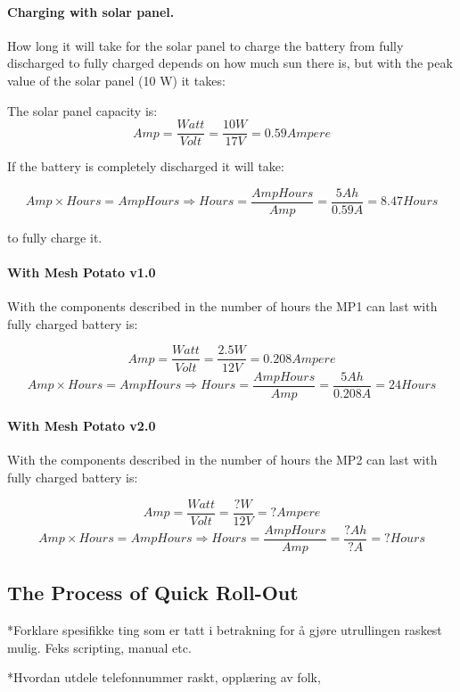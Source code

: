 \paragraph{Charging with solar panel.}
How long it will take for the solar panel to charge the battery from fully discharged to fully charged depends on how much sun there is, but with the peak value of the solar panel (10 W) it takes: 

The solar panel capacity is:
$$Amp = \frac{Watt}{Volt} = \frac{10 W}{17 V} = 0.59 Ampere$$

If the battery is completely discharged it will take: 

$$Amp\times Hours = AmpHours \Rightarrow Hours =\frac{AmpHours}{Amp} = \frac{5 Ah}{0.59 A} = 8.47 Hours$$

to fully charge it. 

\paragraph{With Mesh Potato v1.0}
With the components described in  the number of hours the MP1 can last with fully charged battery is: 

$$Amp = \frac{Watt}{Volt} = \frac{2.5 W}{12 V} = 0.208 Ampere$$
$$Amp\times Hours = AmpHours \Rightarrow Hours = \frac{AmpHours}{Amp} = \frac{5 Ah}{0.208 A} = 24 Hours$$

\paragraph{With Mesh Potato v2.0}
With the components described in  the number of hours the MP2 can last with fully charged battery is: 

$$Amp = \frac{Watt}{Volt} = \frac{? W}{12 V} = ? Ampere$$
$$Amp\times Hours = AmpHours \Rightarrow Hours = \frac{AmpHours}{Amp} = \frac{? Ah}{? A} = ? Hours$$

\subsection{The Process of Quick Roll-Out}
*Forklare spesifikke ting som er tatt i betrakning for å gjøre utrullingen raskest mulig. Feks scripting, manual etc. 

*Hvordan utdele telefonnummer raskt, opplæring av folk, 


